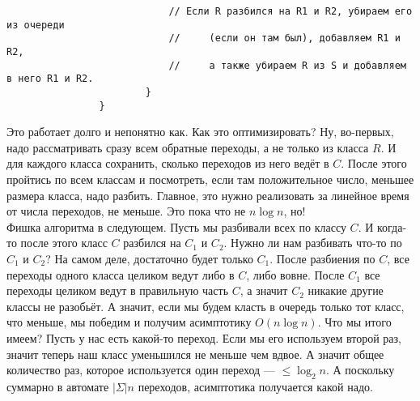 \documentclass{article}
\begin{document}
\begin{itemize}
\begin{Comment}
\begin{verbatim}
                            // Если R разбился на R1 и R2, убираем его из очереди
                            //     (если он там был), добавляем R1 и R2,
                            //     а также убираем R из S и добавляем в него R1 и R2.
                        }
                }
            \end{verbatim}
            Это работает долго и непонятно как. Как это оптимизировать? Ну, во-первых, надо рассматривать сразу всем обратные переходы, а не только из класса $R$. И для каждого класса сохранить, сколько переходов из него ведёт в $C$. После этого пройтись по всем классам и посмотреть, если там положительное число, меньшее размера класса, надо разбить. Главное, это нужно реализовать за линейное время от числа переходов, не меньше. Это пока что не $n\log n$, но!\\
            Фишка алгоритма в следующем. Пусть мы разбивали всех по классу $C$. И когда-то после этого класс $C$ разбился на $C_1$ и $C_2$. Нужно ли нам разбивать что-то по $C_1$ и $C_2$? На самом деле, достаточно будет только $C_1$. После разбиения по $C$, все переходы одного класса целиком ведут либо в $C$, либо вовне. После $C_1$ все переходы целиком ведут в правильную часть $C$, а значит $C_2$ никакие другие классы не разобьёт. А значит, если мы будем класть в очередь только тот класс, что меньше, мы победим и получим асимптотику $O(n\log n)$. Что мы итого имеем? Пусть у нас есть какой-то переход. Если мы его используем второй раз, значит теперь наш класс уменьшился не меньше чем вдвое. А значит общее количество раз, которое используется один переход --- $\leqslant\log_2n$. А поскольку суммарно в автомате $|\Sigma|n$ переходов, асимптотика получается какой надо.
        \end{Comment}
    \end{itemize}
\end{document}
